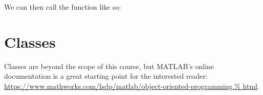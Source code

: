 \documentclass{article}
\begin{document}

\inputminted{matlab}{04-functions.d/outer_product.m}

We can then call the function like so:


\section{Classes}

Classes are beyond the scope of this course, but MATLAB's online
documentation is a great starting point for the interested reader:
\url{https://www.mathworks.com/help/matlab/object-oriented-programming.%
html}.
\end{document}
